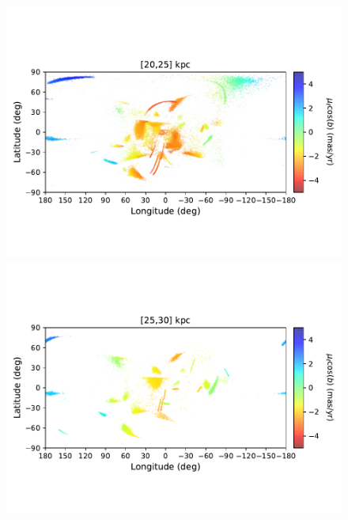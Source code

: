 \begin{figure}[h!]
\begin{center}
            \includegraphics[clip=true, trim = 0mm 20mm 0mm 20mm, width=0.9\columnwidth]{images/PII_ensemble_LB_D20-25_PML_new.pdf}
            \includegraphics[clip=true, trim = 0mm 20mm 0mm 20mm, width=0.9\columnwidth]{images/PII_ensemble_LB_D25-30_PML_new.pdf}


\end{center}
\end{figure}
